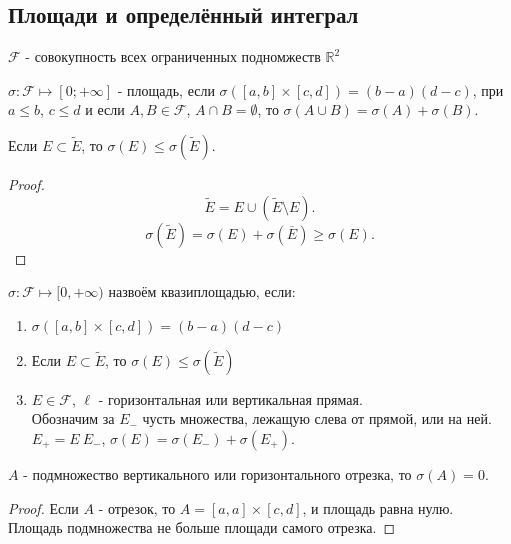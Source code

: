 \documentclass[11pt, oneside]{article}   	%
\begin{document}
    \subsection{Площади и определённый интеграл}
        \begin{definition}
            $\mathcal{F}$ - совокупность всех ограниченных подномжеств $\mathbb{R}^2$
        \end{definition}
        \begin{definition}
            $\sigma : \mathcal{F} \mapsto \left[0; +\infty\right]$ - площадь, если $\sigma\left( \left[a, b\right]\times \left[c, d\right] \right) = (b-a)(d-c)$, при $a\le b$, $c\le d$ и если $A, B\in \mathcal{F}$, $A\cap B = \emptyset$, то $\sigma(A \cup B) = \sigma\left(A\right) + \sigma(B) $.\\

        \end{definition}
        \begin{dlemma}
            Если $E \subset \tilde{E}$, то $\sigma(E) \le \sigma(\tilde{E})$.\\
            \begin{proof}
                \[ \tilde{E} = E \cup (\tilde{E} \setminus E) .\]
                \[ \sigma(\tilde{E}) = \sigma(E) + \sigma(\overline{E}) \ge \sigma(E) .\] 
            \end{proof}
        \end{dlemma}
        \begin{definition}
        $\sigma : \mathcal{F} \mapsto  [0, +\infty)$ назвоём квазиплощадью, если:
            \begin{enumerate}
                \item $\sigma\left( [a, b] \times [c, d] \right) = \left( b-a \right) \left( d-c \right)  $
                \item Если $E \subset  \tilde{E}$, то $\sigma(E) \le \sigma(\tilde{E})$
                \item $E\in \mathcal{F}$, $\ell$ - горизонтальная или вертикальная прямая.\\
                    Обозначим за $E_-$ чусть множества, лежащую слева от прямой, или на ней.\\
                    $E_{+} = E \ E_{-}$, $\sigma(E) = \sigma(E_{-}) + \sigma(E_{+})$.
            \end{enumerate}
        \end{definition}
        \begin{dlemma}
            $A$ - подмножество вертикального или горизонтального отрезка, то $\sigma(A) = 0$.\\
            \begin{proof}
                Если $A$ - отрезок, то $A = \left[a, a\right] \times \left[c, d\right]$, и площадь равна нулю.\\
                Площадь подмножества не больше площади самого отрезка.
            \end{proof}
        \end{dlemma}
\end{document}
